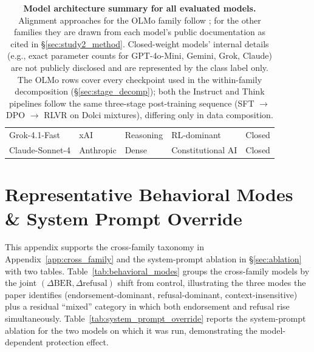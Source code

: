 \documentclass{article}
\begin{document}
\begin{table}[H]
\begin{tabular}{l l l l l}
        Grok-4.1-Fast & xAI & Reasoning & RL-dominant \citep{xai2025grok41} & Closed \\
        Claude-Sonnet-4 & Anthropic & Dense & Constitutional AI \citep{bai2022constitutional} & Closed \\
        \bottomrule
    \end{tabular}
    \caption{\textbf{Model architecture summary for all evaluated models.} Alignment approaches for the OLMo family follow \citet{olmo3}; for the other families they are drawn from each model's public documentation as cited in \S\ref{sec:study2_method}. Closed-weight models' internal details (e.g., exact parameter counts for GPT-4o-Mini, Gemini, Grok, Claude) are not publicly disclosed and are represented by the class label only. The OLMo rows cover every checkpoint used in the within-family decomposition (\S\ref{sec:stage_decomp}); both the Instruct and Think pipelines follow the same three-stage post-training sequence (SFT $\to$ DPO $\to$ RLVR on Dolci mixtures), differing only in data composition.}
    \label{tab:arch_summary}
\end{table}

\section{Representative Behavioral Modes \& System Prompt Override}
\label{app:behavioral_examples}

This appendix supports the cross-family taxonomy in Appendix~\ref{app:cross_family} and the system-prompt ablation in \S\ref{sec:ablation} with two tables. Table~\ref{tab:behavioral_modes} groups the cross-family models by the joint $(\Delta\text{BER}, \Delta\text{refusal})$ shift from control, illustrating the three modes the paper identifies (endorsement-dominant, refusal-dominant, context-insensitive) plus a residual ``mixed'' category in which both endorsement and refusal rise simultaneously. Table~\ref{tab:system_prompt_override} reports the system-prompt ablation for the two models on which it was run, demonstrating the model-dependent protection effect.
\end{document}
